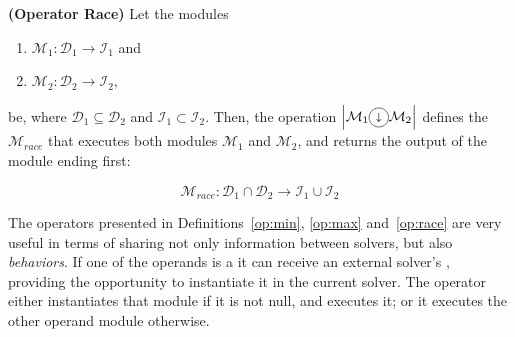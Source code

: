 \begin{definition}\label{op:race}
{\bf (Operator Race)} Let the modules
\begin{enumerate}%
	\item $\mathcal{M}_1 : \mathcal{D}_1 \rightarrow \mathcal{I}_1$ and  
	\item $\mathcal{M}_2 : \mathcal{D}_2 \rightarrow \mathcal{I}_2$,
\end{enumerate}%
be, where $\mathcal{D}_1 \subseteq \mathcal{D}_2$ and $\mathcal{I}_1 \subset \mathcal{I}_2$. Then, the operation $\left|\mathcal{M}_1\circled{$\shortdownarrow$}\mathcal{M}_2\right|$ defines the \cm{} $\mathcal{M}_{race}$ that executes both modules $\mathcal{M}_1$ and $\mathcal{M}_2$, and returns the output of the module ending first:

\[
\mathcal{M}_{race}:\mathcal{D}_1\cap\mathcal{D}_2 \rightarrow \mathcal{I}_1 \cup \mathcal{I}_2 
\]
\end{definition}

%
%


The operators presented in Definitions~\ref{op:min}, \ref{op:max} and~\ref{op:race} are very useful in terms of sharing not only information between solvers, but also {\it behaviors}. If one of the operands is a \opch{} it can receive an external solver's \om{}, providing the opportunity to instantiate it in the current solver. The operator either instantiates that module if it is not null, and executes it; or it executes the other operand module otherwise.

